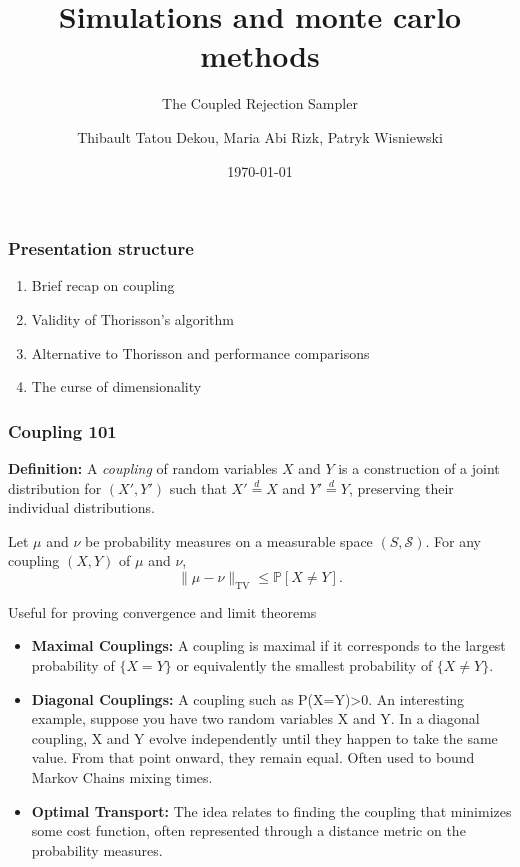 \documentclass{beamer}
\title{Simulations and monte carlo methods}
\subtitle{The Coupled Rejection Sampler}
\author{Thibault Tatou Dekou, Maria Abi Rizk, Patryk Wisniewski}
\institute{ENSAE 2A}
\date{\today}
\begin{document}
\maketitle
\begin{frame}
\frametitle{Presentation structure}
\begin{enumerate}
\item Brief recap on coupling
\item Validity of Thorisson's algorithm
\item Alternative to Thorisson and performance comparisons
\item The curse of dimensionality
\end{enumerate}
\end{frame}
\begin{frame}
\frametitle{Coupling 101}
\textbf{Definition:} A \textit{coupling} of random variables $X$ and $Y$ is a construction of a joint distribution for $(X', Y')$ such that $X' \overset{d}{=} X$ and $Y' \overset{d}{=} Y$, preserving their individual distributions.
\begin{theorem}
Let \(\mu\) and \(\nu\) be probability measures on a measurable space \((S, \mathcal{S})\). For any coupling \((X, Y)\) of \(\mu\) and \(\nu\),
\[
\|\mu - \nu\|_{\text{TV}} \leq \mathbb{P}[X \neq Y].
\]
\end{theorem}
Useful for proving convergence and limit theorems
\vspace*{-0.2cm}
\end{frame}
\begin{frame}
\begin{itemize}
\frametitle{Coupling 102}
    \item \textbf{Maximal Couplings:} A coupling is maximal if it corresponds to the largest probability of \(\{X = Y\}\) or equivalently the smallest probability of \(\{X \neq Y\}\).
    
    \item \textbf{Diagonal Couplings:} A coupling such as P(X=Y)>0. An interesting example, suppose you have two random variables X and Y. In a diagonal coupling, X and Y evolve independently until they happen to take the same value. From that point onward, they remain equal. Often used to bound Markov Chains mixing times. 
    
\item \textbf{Optimal Transport:} The idea relates to finding the coupling that minimizes some cost function, often represented through a distance metric on the probability measures.
\end{itemize}
\end{frame}
\end{document}
